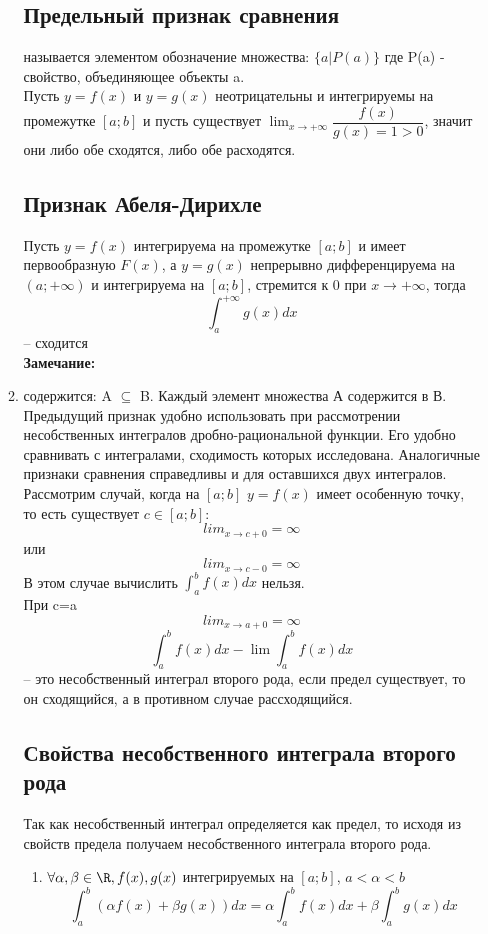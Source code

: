 \documentclass[oneside]{book}
\begin{document}
\begin{itemize}
\begin{enumerate}
 \subsection{Предельный признак сравнения}
называется элементом обозначение множества: $\{a | P(a)\}$ где P(a) - свойство, объединяющее объекты a.\\
Пусть  $y=f(x)$ и $y=g(x)$ неотрицательны и интегрируемы на промежутке $[a;b]$ и пусть существует $\lim_{x\to{+\infty}}\dfrac{f(x)}{g(x)=1>0}$, значит они либо обе сходятся, либо обе расходятся.
\subsection{Признак Абеля-Дирихле} {\huge \color{red}{КАК ЭТИ ВЕЩИ ВООБЩЕ СВЯЗАНЫ?}}
Пусть  $y=f(x)$ интегрируема на промежутке $[a;b]$  и имеет первообразную $F(x)$, а $y=g(x)$ непрерывно дифференцируема на $(a;+\infty)$ и интегрируема на $[a;b]$, стремится к 0 при $x\to{+\infty}$, тогда $$\int_{a}^{+\infty}g(x)dx$$ -- сходится\\
\textbf{Замечание:}\\
    \item содержится: A $\subseteq$ B. Каждый элемент множества А содержится в В.
      Предыдущий признак удобно использовать при рассмотрении несобственных интегралов дробно-рациональной функции. Его удобно сравнивать с интегралами, сходимость которых исследована. Аналогичные признаки сравнения справедливы и для оставшихся двух интегралов.\\
Рассмотрим случай, когда на $[a;b]$ $y=f(x)$ имеет особенную точку, то есть существует $c\in[a;b]$:
$$lim_{x\to{c+0}}=\infty$$ или $$lim_{x\to{c-0}}=\infty$$
В этом случае вычислить $\int_{a}^{b}f(x)dx$ нельзя.\\{\huge\color{red}{на этом месте я опять отключился}}
При c=a $$lim_{x\to{a+0}}=\infty$$
$$\int_{a}^{b}f(x)dx-\lim\int_{a}^{b}f(x)dx$$ --
это несобственный интеграл второго рода, если предел существует, то он сходящийся, а в противном случае рассходящийся.{\huge\color{red}{тут чет то невнятное пропустил}}

\subsection{Свойства несобственного интеграла второго рода}
Так как несобственный интеграл определяется как предел, то исходя из свойств предела получаем несобственного интеграла второго рода.
\begin{enumerate}[label=\arabic*.]
\item $\forall \alpha,\beta \in \R, f(x),g(x)$ интегрируемых на $[a;b]$, $a<\alpha<b$
$$\int_{a}^{b}(\alpha f(x)+\beta g(x))dx = \alpha \int_{a}^{b}f(x)dx+\beta \int_{a}^{b}g(x)dx$$


\end{enumerate}
\end{enumerate}
\end{itemize}
\end{document}
